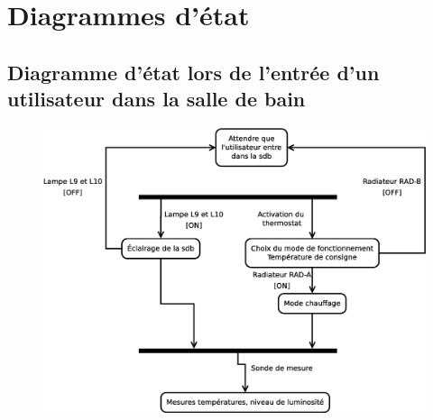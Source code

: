 \chapter{Diagrammes d'état}
\section{Diagramme d'état lors de l'entrée d'un utilisateur dans la salle de bain}
\begin{figure}[H]
	\centering
	\includegraphics[width=1\linewidth]{diagrams/bathroom/diagramme_etat_st.eps}
	\label{fig:diagramme_st}
\end{figure}
%
